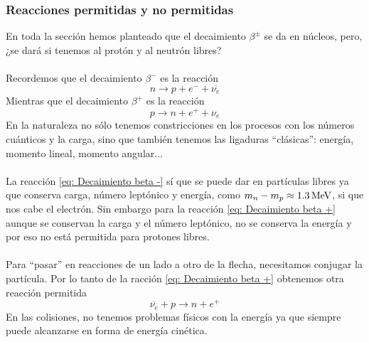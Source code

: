 \subsubsection{Reacciones permitidas y no permitidas}
En toda la sección hemos planteado que el decaimiento $\beta^\pm$ se da en núcleos, pero, ¿se dará si tenemos al protón y al neutrón libres?\\\\
Recordemos que el decaimiento $\beta^-$ es la reacción
\begin{equation}
    n\longrightarrow p+e^-+\overline{\nu_e}
    \label{eq: Decaimiento beta -}
\end{equation}
Mientras que el decaimiento $\beta^+$ es la reacción
\begin{equation}
    p \longrightarrow n+e^++\nu_e
    \label{eq: Decaimiento beta +}
\end{equation}
En la naturaleza no sólo tenemos constricciones en los procesos con los números cuánticos y la carga, sino que también tenemos las ligaduras ``clásicas'': energía, momento lineal, momento angular...\\\\
La reacción \ref{eq: Decaimiento beta -} sí que se puede dar en partículas libres ya que conserva carga, número leptónico y energía, como $m_n-m_p\approx \unit[1.3]{MeV}$, si que nos cabe el electrón. Sin embargo para la reacción \ref{eq: Decaimiento beta +} aunque se conservan la carga y el número leptónico, no se conserva la energía y por eso no está permitida para protones libres.\\\\
Para ``pasar'' en reacciones de un lado a otro de la flecha, necesitamos conjugar la partícula. Por lo tanto de la racción \ref{eq: Decaimiento beta +} obtenemos otra reacción permitida
\begin{equation}
    \overline{\nu_e} + p \longrightarrow n+e^+
    \label{eq: colision proton antineutrino}
\end{equation}
En las colisiones, no tenemos problemas físicos con la energía ya que siempre puede alcanzarse en forma de energía cinética.
\clearpage
